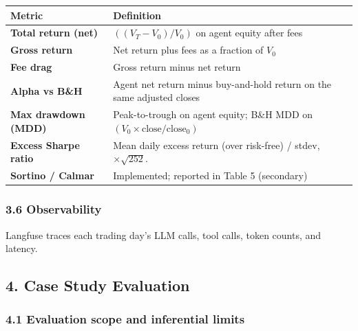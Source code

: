\documentclass{article}
\begin{document}
\begin{tabularx}{\linewidth}{@{} l X @{}}\toprule
Metric & Definition \\
\midrule
\textbf{Total return (net)} &
  $((V_T - V_0) / V_0)$ on agent equity after fees \\
\addlinespace
\textbf{Gross return} &
  Net return plus fees as a fraction of $V_0$ \\
\addlinespace
\textbf{Fee drag} &
  Gross return minus net return \\
\addlinespace
\textbf{Alpha vs B\&H} &
  Agent net return minus buy-and-hold return on the same adjusted closes \\
\addlinespace
\textbf{Max drawdown (MDD)} &
  Peak-to-trough on agent equity;
  B\&H MDD on $(V_0 \times \mathrm{close}/\mathrm{close}_0)$ \\
\addlinespace
\textbf{Excess Sharpe ratio} &
  Mean daily excess return (over risk-free) / stdev, $\times \sqrt{252}$.\footnotemark \\
\addlinespace
\textbf{Sortino / Calmar} &
  Implemented; reported in Table 5 (secondary) \\
\bottomrule
\end{tabularx}

\subsubsection{3.6 Observability}\label{observability}
Langfuse traces each trading day's LLM calls, tool calls, token counts,
and latency.

\subsection{4. Case Study Evaluation}\label{case-study-evaluation}

\subsubsection{4.1 Evaluation scope and inferential
limits}\label{evaluation-scope-and-inferential-limits}
\end{document}
